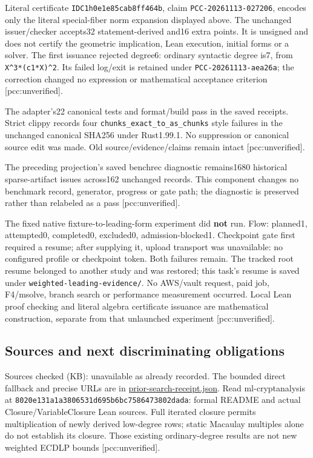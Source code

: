 \documentclass[
  10pt,
]{article}
\begin{document}
Literal certificate \texttt{IDC1h0e1e85cab8ff464b}, claim
\texttt{PCC-20261113-027206}, encodes only the literal special-fiber
norm expansion displayed above. The unchanged issuer/checker accepts32
statement-derived and16 extra points. It is unsigned and does not
certify the geometric implication, Lean execution, initial forms or a
solver. The first issuance rejected degree6: ordinary syntactic degree
is7, from \texttt{X\^{}3*(c1*X)\^{}2}. Its failed log/exit is retained
under \texttt{PCC-20261113-aea26a}; the correction changed no expression
or mathematical acceptance criterion {[}pcc:unverified{]}.

The adapter's22 canonical tests and format/build pass in the saved
receipts. Strict clippy records four
\texttt{chunks\_exact\_to\_as\_chunks} style failures in the unchanged
canonical SHA256 under Rust1.99.1. No suppression or canonical source
edit was made. Old source/evidence/claims remain intact
{[}pcc:unverified{]}.

The preceding projection's saved benchrec diagnostic remains1680
historical sparse-artifact issues across162 unchanged records. This
component changes no benchmark record, generator, progress or gate path;
the diagnostic is preserved rather than relabeled as a pass
{[}pcc:unverified{]}.

The fixed native fixture-to-leading-form experiment did \textbf{not}
run. Flow: planned1, attempted0, completed0, excluded0,
admission-blocked1. Checkpoint gate first required a resume; after
supplying it, upload transport was unavailable: no configured profile or
checkpoint token. Both failures remain. The tracked root resume belonged
to another study and was restored; this task's resume is saved under
\texttt{weighted-leading-evidence/}. No AWS/vault request, paid job,
F4/msolve, branch search or performance measurement occurred. Local Lean
proof checking and literal algebra certificate issuance are mathematical
construction, separate from that unlaunched experiment
{[}pcc:unverified{]}.

\subsection{Sources and next discriminating
obligations}\label{sources-and-next-discriminating-obligations}

Sources checked (KB): unavailable as already recorded. The bounded
direct fallback and precise URLs are in
\href{../weighted-leading-evidence/prior-search-receipt.json}{prior-search-receipt.json}.
Read ml-cryptanalysis at
\texttt{8020e131a1a3806531d695b6bc7586473802dada}: formal README and
actual Closure/VariableClosure Lean sources. Full iterated closure
permits multiplication of newly derived low-degree rows; static Macaulay
multiples alone do not establish its closure. Those existing
ordinary-degree results are not new weighted ECDLP bounds
{[}pcc:unverified{]}.
\end{document}

